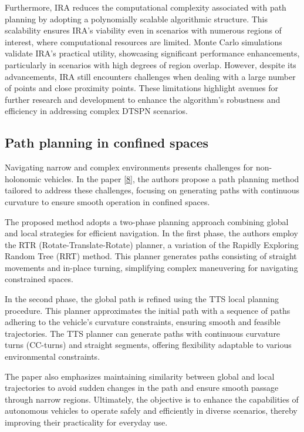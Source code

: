 \vspace*{6mm}

Furthermore, IRA reduces the computational complexity associated with path planning by adopting a polynomially scalable algorithmic structure. This scalability ensures IRA's viability even in scenarios with numerous regions of interest, where computational resources are limited. Monte Carlo simulations validate IRA's practical utility, showcasing significant performance enhancements, particularly in scenarios with high degrees of region overlap. However, despite its advancements, IRA still encounters challenges when dealing with a large number of points and close proximity points. These limitations highlight avenues for further research and development to enhance the algorithm's robustness and efficiency in addressing complex DTSPN scenarios.








\subsection{Path planning in confined spaces}


Navigating narrow and complex environments presents challenges for non-holonomic vehicles. In the paper \hyperlink{cite.mapping}{[8]}, the authors propose a path planning method tailored to address these challenges, focusing on generating paths with continuous curvature to ensure smooth operation in confined spaces.

\vspace*{6mm}

The proposed method adopts a two-phase planning approach combining global and local strategies for efficient navigation. In the first phase, the authors employ the RTR (Rotate-Translate-Rotate) planner, a variation of the Rapidly Exploring Random Tree (RRT) method. This planner generates paths consisting of straight movements and in-place turning, simplifying complex maneuvering for navigating constrained spaces.

\vspace*{6mm}

In the second phase, the global path is refined using the TTS local planning procedure. This planner approximates the initial path with a sequence of paths adhering to the vehicle's curvature constraints, ensuring smooth and feasible trajectories. The TTS planner can generate paths with continuous curvature turns (CC-turns) and straight segments, offering flexibility adaptable to various environmental constraints.

\vspace*{6mm}

The paper also emphasizes maintaining similarity between global and local trajectories to avoid sudden changes in the path and ensure smooth passage through narrow regions. Ultimately, the objective is to enhance the capabilities of autonomous vehicles to operate safely and efficiently in diverse scenarios, thereby improving their practicality for everyday use.

\vspace*{6mm}


